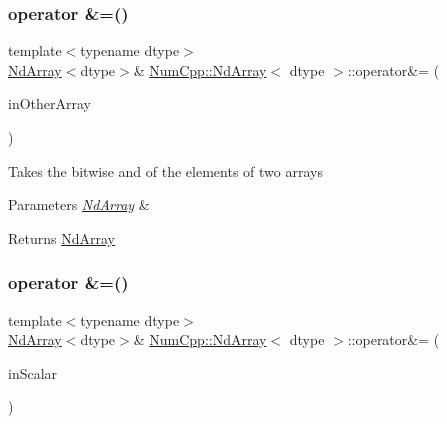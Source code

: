 \subsubsection{\texorpdfstring{operator \&=()}{operator \&=()}\hspace{0.1cm}{\footnotesize\ttfamily [1/2]}}
{\footnotesize\ttfamily template$<$typename dtype$>$ \\
\mbox{\hyperlink{class_num_cpp_1_1_nd_array}{Nd\+Array}}$<$dtype$>$\& \mbox{\hyperlink{class_num_cpp_1_1_nd_array}{Num\+Cpp\+::\+Nd\+Array}}$<$ dtype $>$\+::operator\&= (\begin{DoxyParamCaption}\item[{const \mbox{\hyperlink{class_num_cpp_1_1_nd_array}{Nd\+Array}}$<$ dtype $>$ \&}]{in\+Other\+Array }\end{DoxyParamCaption})\hspace{0.3cm}{\ttfamily [inline]}}

Takes the bitwise and of the elements of two arrays


\begin{DoxyParams}{Parameters}
{\em \mbox{\hyperlink{class_num_cpp_1_1_nd_array}{Nd\+Array}}} & \\
\hline
\end{DoxyParams}
\begin{DoxyReturn}{Returns}
\mbox{\hyperlink{class_num_cpp_1_1_nd_array}{Nd\+Array}} 
\end{DoxyReturn}
\mbox{\label{class_num_cpp_1_1_nd_array_ab7f8c1331eadc36d0260015a1e5cf26a}} 
\subsubsection{\texorpdfstring{operator \&=()}{operator \&=()}\hspace{0.1cm}{\footnotesize\ttfamily [2/2]}}
{\footnotesize\ttfamily template$<$typename dtype$>$ \\
\mbox{\hyperlink{class_num_cpp_1_1_nd_array}{Nd\+Array}}$<$dtype$>$\& \mbox{\hyperlink{class_num_cpp_1_1_nd_array}{Num\+Cpp\+::\+Nd\+Array}}$<$ dtype $>$\+::operator\&= (\begin{DoxyParamCaption}\item[{dtype}]{in\+Scalar }\end{DoxyParamCaption})\hspace{0.3cm}{\ttfamily [inline]}}

